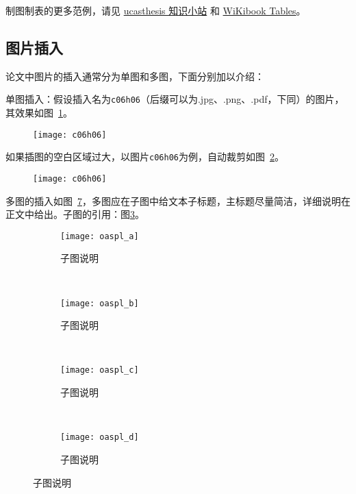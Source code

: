 制图制表的更多范例，请见 \href{https://github.com/mohuangrui/ucasthesis/wiki}{ucasthesis 知识小站} 和 \href{https://en.wikibooks.org/wiki/LaTeX/Tables}{WiKibook Tables}。

\subsection{图片插入}

论文中图片的插入通常分为单图和多图，下面分别加以介绍：

单图插入：假设插入名为\verb|c06h06|（后缀可以为.jpg、.png、.pdf，下同）的图片，其效果如图~\ref{fig:c06h06}。
\begin{figure}[!htbp]
    \centering
    \texttt{[image: c06h06]}
    \label{fig:c06h06}
\end{figure}

如果插图的空白区域过大，以图片\verb|c06h06|为例，自动裁剪如图~\ref{fig:c06h06_trim}。
\begin{figure}[!htbp]
    \centering
    \texttt{[image: c06h06]}
    \label{fig:c06h06_trim}
\end{figure}

多图的插入如图~\ref{fig:oaspl}，多图应在子图中给文本子标题，主标题尽量简洁，详细说明在正文中给出。子图的引用：图\ref{fig:oaspl_a}。
\begin{figure}[!htbp]
    \centering
    \begin{subfigure}[b]{0.35\textwidth}
      \texttt{[image: oaspl\_a]}
      \caption{子图说明}
      \label{fig:oaspl_a}
    \end{subfigure}%
    ~%
    \begin{subfigure}[b]{0.35\textwidth}
      \texttt{[image: oaspl\_b]}
      \caption{子图说明}
      \label{fig:oaspl_b}
    \end{subfigure}
    \\%
    \begin{subfigure}[b]{0.35\textwidth}
      \texttt{[image: oaspl\_c]}
      \caption{子图说明}
      \label{fig:oaspl_c}
    \end{subfigure}%
    ~%
    \begin{subfigure}[b]{0.35\textwidth}
      \texttt{[image: oaspl\_d]}
      \caption{子图说明}
      \label{fig:oaspl_d}
    \end{subfigure}
    \label{fig:oaspl}
\end{figure}

